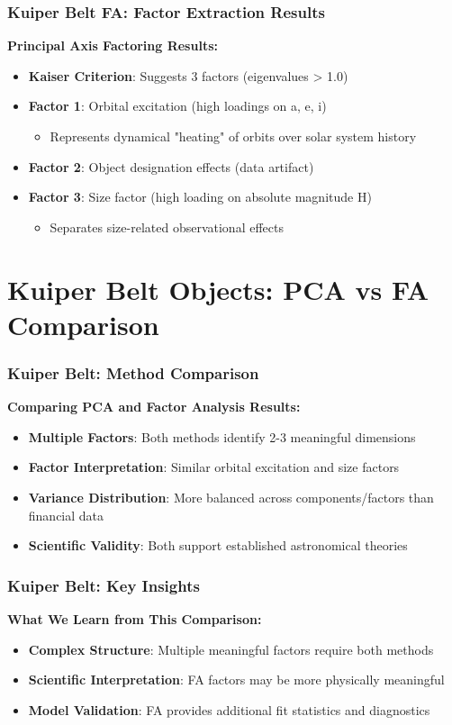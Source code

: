 \documentclass[aspectratio=169]{beamer}
\begin{document}
\begin{frame}
    \frametitle{Kuiper Belt FA: Factor Extraction Results}
    \textbf{Principal Axis Factoring Results:}
    \begin{itemize}
        \item \textbf{Kaiser Criterion}: Suggests 3 factors (eigenvalues > 1.0) \pause
        \item \textbf{Factor 1}: Orbital excitation (high loadings on a, e, i) \pause
              \begin{itemize}
                  \item Represents dynamical "heating" of orbits over solar system history \pause
              \end{itemize}
        \item \textbf{Factor 2}: Object designation effects (data artifact) \pause
        \item \textbf{Factor 3}: Size factor (high loading on absolute magnitude H) \pause
              \begin{itemize}
                  \item Separates size-related observational effects \pause
              \end{itemize}
    \end{itemize}
\end{frame}

\section{Kuiper Belt Objects: PCA vs FA Comparison}

\begin{frame}
    \frametitle{Kuiper Belt: Method Comparison}
    \textbf{Comparing PCA and Factor Analysis Results:}
    \begin{itemize}
        \item \textbf{Multiple Factors}: Both methods identify 2-3 meaningful dimensions \pause
        \item \textbf{Factor Interpretation}: Similar orbital excitation and size factors \pause
        \item \textbf{Variance Distribution}: More balanced across components/factors than financial data \pause
        \item \textbf{Scientific Validity}: Both support established astronomical theories \pause
    \end{itemize}
\end{frame}

\begin{frame}
    \frametitle{Kuiper Belt: Key Insights}
    \textbf{What We Learn from This Comparison:}
    \begin{itemize}
        \item \textbf{Complex Structure}: Multiple meaningful factors require both methods \pause
        \item \textbf{Scientific Interpretation}: FA factors may be more physically meaningful \pause
        \item \textbf{Model Validation}: FA provides additional fit statistics and diagnostics \pause
    \end{itemize}
\end{frame}
\end{document}
